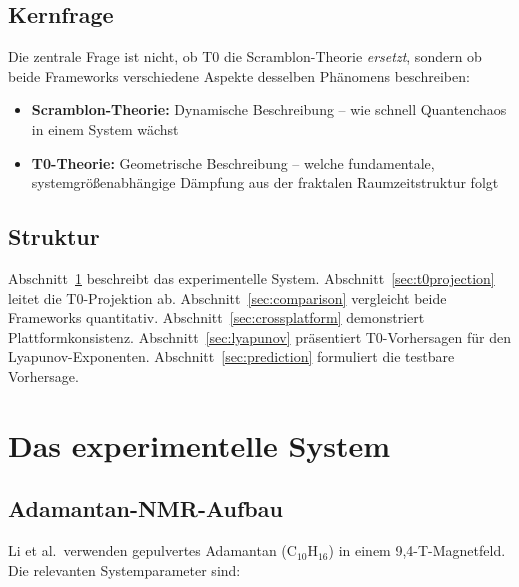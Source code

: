 \subsection{Kernfrage}

Die zentrale Frage ist nicht, ob T0 die Scramblon-Theorie \emph{ersetzt}, sondern ob beide Frameworks verschiedene Aspekte desselben Phänomens beschreiben:
\begin{itemize}
	\item \textbf{Scramblon-Theorie:} Dynamische Beschreibung -- wie schnell Quantenchaos in einem System wächst
	\item \textbf{T0-Theorie:} Geometrische Beschreibung -- welche fundamentale, systemgrößenabhängige Dämpfung aus der fraktalen Raumzeitstruktur folgt
\end{itemize}

\subsection{Struktur}

Abschnitt~\ref{sec:system} beschreibt das experimentelle System. Abschnitt~\ref{sec:t0projection} leitet die T0-Projektion ab. Abschnitt~\ref{sec:comparison} vergleicht beide Frameworks quantitativ. Abschnitt~\ref{sec:crossplatform} demonstriert Plattformkonsistenz. Abschnitt~\ref{sec:lyapunov} präsentiert T0-Vorhersagen für den Lyapunov-Exponenten. Abschnitt~\ref{sec:prediction} formuliert die testbare Vorhersage.


\section{Das experimentelle System}
\label{sec:system}

\subsection{Adamantan-NMR-Aufbau}

Li et al.\ verwenden gepulvertes Adamantan (C$_{10}$H$_{16}$) in einem 9,4-T-Magnetfeld. Die relevanten Systemparameter sind:

\begin{table}[h]
	\centering
	\caption{Experimentelle Parameter des NMR-Systems (Li et al.)}
	\label{tab:system_params}
\end{table}

